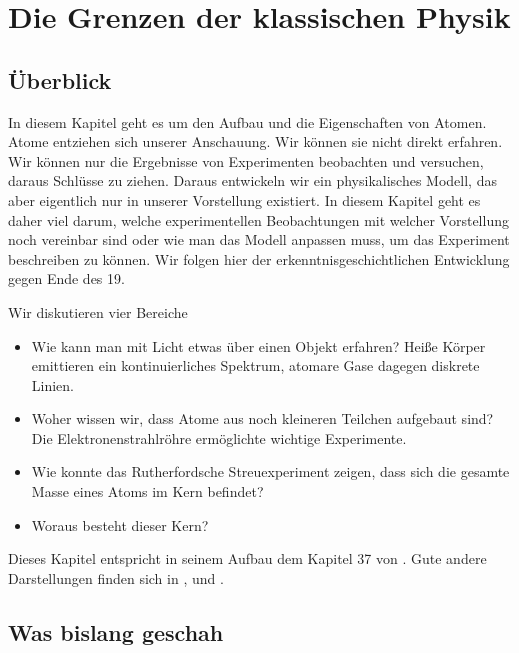 \renewcommand{\lastmod}{7. Oktober 2024}
\renewcommand{\chapterauthors}{Markus Lippitz}

\chapter{Die Grenzen der klassischen Physik}


\section{Überblick}

In diesem Kapitel geht es um den Aufbau und die Eigenschaften von Atomen. Atome entziehen sich unserer Anschauung. Wir können sie nicht direkt erfahren. Wir können nur die Ergebnisse von Experimenten beobachten und versuchen, daraus Schlüsse zu ziehen. Daraus entwickeln wir ein physikalisches Modell, das aber eigentlich nur in unserer Vorstellung existiert. In diesem Kapitel geht es daher viel darum, welche experimentellen Beobachtungen mit welcher Vorstellung noch vereinbar sind oder wie man das Modell anpassen muss, um das Experiment beschreiben zu können. Wir folgen hier der erkenntnisgeschichtlichen Entwicklung gegen Ende des 19.

\vspace*{\parskip}

Wir diskutieren vier Bereiche
\begin{itemize} \setlength{\itemsep}{0pt}
    \item Wie kann man mit Licht etwas über einen Objekt erfahren? Heiße Körper emittieren ein kontinuierliches Spektrum, atomare Gase dagegen diskrete Linien.
    \item Woher wissen wir, dass Atome aus noch kleineren Teilchen aufgebaut sind? Die Elektronenstrahlröhre ermöglichte wichtige Experimente.
    \item Wie konnte das Rutherfordsche Streuexperiment zeigen, dass sich die gesamte Masse eines Atoms im Kern befindet?
    \item Woraus besteht dieser Kern?
\end{itemize}


Dieses Kapitel entspricht in seinem Aufbau dem Kapitel 37 von \cite{Knight_physics}. Gute andere Darstellungen finden sich in \cite{Haliday_Resnick}, \cite{Demtröder_ep3} und \cite{Haken_wolf_I}.





\section{Was bislang geschah}

